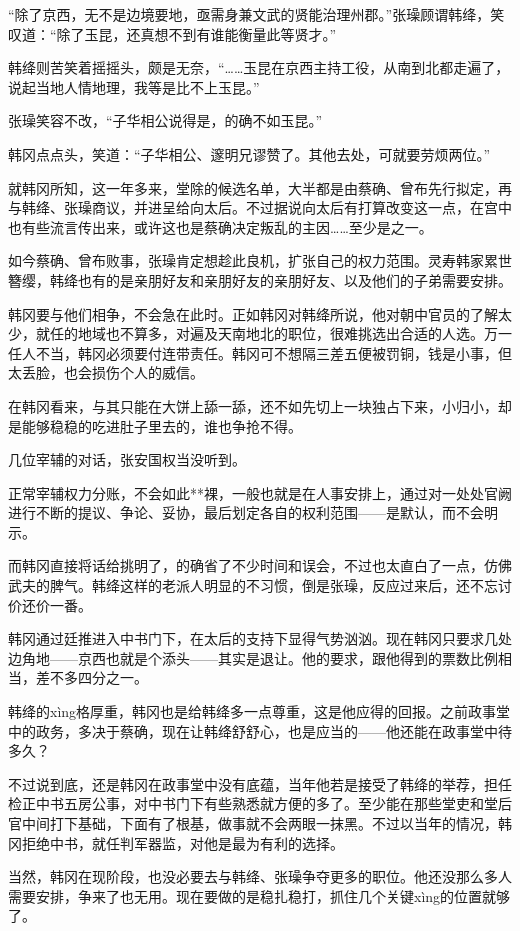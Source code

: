 “除了京西，无不是边境要地，亟需身兼文武的贤能治理州郡。”张璪顾谓韩绛，笑叹道：“除了玉昆，还真想不到有谁能衡量此等贤才。”

韩绛则苦笑着摇摇头，颇是无奈，“……玉昆在京西主持工役，从南到北都走遍了，说起当地人情地理，我等是比不上玉昆。”

张璪笑容不改，“子华相公说得是，的确不如玉昆。”

韩冈点点头，笑道：“子华相公、邃明兄谬赞了。其他去处，可就要劳烦两位。”

就韩冈所知，这一年多来，堂除的候选名单，大半都是由蔡确、曾布先行拟定，再与韩绛、张璪商议，并进呈给向太后。不过据说向太后有打算改变这一点，在宫中也有些流言传出来，或许这也是蔡确决定叛乱的主因……至少是之一。

如今蔡确、曾布败事，张璪肯定想趁此良机，扩张自己的权力范围。灵寿韩家累世簪缨，韩绛也有的是亲朋好友和亲朋好友的亲朋好友、以及他们的子弟需要安排。

韩冈要与他们相争，不会急在此时。正如韩冈对韩绛所说，他对朝中官员的了解太少，就任的地域也不算多，对遍及天南地北的职位，很难挑选出合适的人选。万一任人不当，韩冈必须要付连带责任。韩冈可不想隔三差五便被罚铜，钱是小事，但太丢脸，也会损伤个人的威信。

在韩冈看来，与其只能在大饼上舔一舔，还不如先切上一块独占下来，小归小，却是能够稳稳的吃进肚子里去的，谁也争抢不得。

几位宰辅的对话，张安国权当没听到。

正常宰辅权力分账，不会如此**裸，一般也就是在人事安排上，通过对一处处官阙进行不断的提议、争论、妥协，最后划定各自的权利范围——是默认，而不会明示。

而韩冈直接将话给挑明了，的确省了不少时间和误会，不过也太直白了一点，仿佛武夫的脾气。韩绛这样的老派人明显的不习惯，倒是张璪，反应过来后，还不忘讨价还价一番。

韩冈通过廷推进入中书门下，在太后的支持下显得气势汹汹。现在韩冈只要求几处边角地——京西也就是个添头——其实是退让。他的要求，跟他得到的票数比例相当，差不多四分之一。

韩绛的xìng格厚重，韩冈也是给韩绛多一点尊重，这是他应得的回报。之前政事堂中的政务，多决于蔡确，现在让韩绛舒舒心，也是应当的——他还能在政事堂中待多久？

不过说到底，还是韩冈在政事堂中没有底蕴，当年他若是接受了韩绛的举荐，担任检正中书五房公事，对中书门下有些熟悉就方便的多了。至少能在那些堂吏和堂后官中间打下基础，下面有了根基，做事就不会两眼一抹黑。不过以当年的情况，韩冈拒绝中书，就任判军器监，对他是最为有利的选择。

当然，韩冈在现阶段，也没必要去与韩绛、张璪争夺更多的职位。他还没那么多人需要安排，争来了也无用。现在要做的是稳扎稳打，抓住几个关键xìng的位置就够了。

